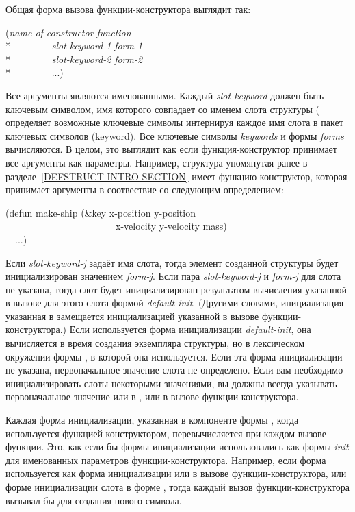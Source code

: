 Общая форма вызова функции-конструктора выглядит так:
\begin{lisp}
(\emph{name-of-constructor-function} \\*
~~~~~~~~\emph{slot-keyword-1} \emph{form-1} \\*
~~~~~~~~\emph{slot-keyword-2} \emph{form-2} \\*
~~~~~~~~...)
\end{lisp}
Все аргументы являются именованными. Каждый \emph{slot-keyword} должен быть
ключевым символом, имя которого совпадает со именем слота структуры
( определяет возможные ключевые символы интернируя каждое имя
слота в пакет ключевых символов (keyword). Все ключевые символы \emph{keywords}
и формы \emph{forms} вычисляются. В целом, это выглядит как если функция-конструктор принимает все аргументы как  параметры. Например,
структура  упомянутая ранее в разделе~\ref{DEFSTRUCT-INTRO-SECTION}
имеет функцию-конструктор, которая принимает аргументы в соотвествие со
следующим определением:
\begin{lisp}
(defun make-ship (\&key x-position y-position \\
~~~~~~~~~~~~~~~~~~~~~~~x-velocity y-velocity mass) \\
~~...)
\end{lisp}

\label{defstruct-initialization}
Если \emph{slot-keyword-j} задаёт имя слота, тогда элемент созданной структуры
будет инициализирован значением \emph{form-j}.
Если пара \emph{slot-keyword-j} и \emph{form-j} для слота не указана, тогда слот
будет инициализирован результатом вычисления указанной в вызове 
для этого слота формой \emph{default-init}.
(Другими словами, инициализация указанная в  замещается
инициализацией указанной в вызове функции-конструктора.)
Если используется форма инициализации \emph{default-init}, она вычисляется в
время создания экземпляра структуры, но в лексическом окружении формы
, в которой она используется.
Если эта форма инициализации не указана, первоначальное значение слота не
определено.
Если вам необходимо инициализировать слоты некоторыми значениями, вы должны
всегда указывать первоначальное значение или в , или в 
вызове функции-конструктора. 

Каждая форма инициализации, указанная в компоненте формы , когда
используется функцией-конструктором, перевычисляется при каждом вызове
функции. Это, как если бы формы инициализации использовались как формы
\emph{init} для именованных параметров функции-конструктора.
Например, если форма  используется как форма инициализации или в
вызове функции-конструктора, или форме инициализации слота в форме
, тогда каждый вызов функции-конструктора вызывал бы 
для создания нового символа.

